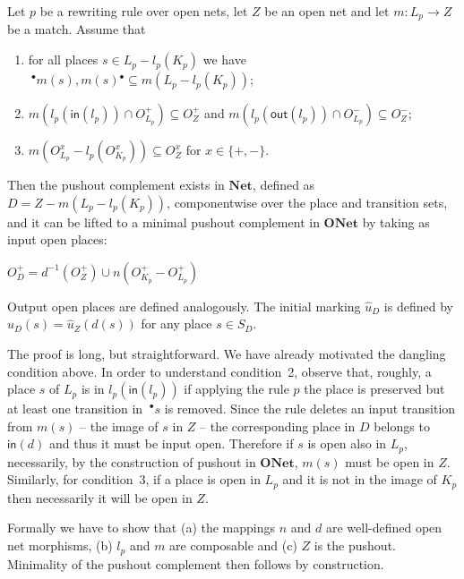 \documentclass{LMCS}
\newcommand{\inp}[1]{\ensuremath{\mathsf{in}({#1})}}
\newcommand{\out}[1]{\ensuremath{\mathsf{out}({#1})}}
\newcommand{\init}[1]{\hat{#1}}
\newcommand{\pre}[1][(\cdot)]{\ensuremath{\!~^\bullet{#1}}}
\newcommand{\post}[1][(\cdot)]{\ensuremath{{#1} {^\bullet}}}
\newcommand{\onet}{\ensuremath{\mathbf{ONet}}}
\newcommand{\net}{\ensuremath{\mathbf{Net}}}
\begin{document}
\begin{lem}
  \label{le:po-complement}
  Let $p$ be a rewriting rule over open nets, let $Z$ be an open net and let
  $m : L_p \to Z$ be a match. Assume that
  \begin{enumerate}[\em(1)]

  \item for all places $s \in L_p - l_p(K_p)$ we have $\pre[m(s)], \post[m(s)]
    \subseteq m(L_p - l_p(K_p))$;

  \item
    $m(l_p(\inp{l_p}) \cap O_{L_p}^+) \subseteq O_Z^+$  
    and $m(l_p(\out{l_p}) \cap O_{L_p}^-) \subseteq O_Z^-$;

  \item $m(O_{L_p}^x - l_p(O_{K_p}^x)) \subseteq O_Z^x$ for $x \in \{+,-\}$.


  \end{enumerate}
  Then the pushout complement exists in $\net$, defined as $D = Z -
  m(L_p - l_p(K_p))$, componentwise over the place and transition
  sets, and it can be lifted to a minimal pushout complement in
  $\onet$ by taking as input open places:
  \begin{center}
     $O_D^+ = d^{-1}(O_Z^+) \cup n(O_{K_p}^+ - O_{L_p}^+)$
  \end{center}
  Output open places are defined analogously.
  The initial marking $\init{u}_D$ is defined by $\init{u}_D(s) = \init{u}_Z(d(s))$ for any place
  $s \in S_D$.
\end{lem}


\proof
  The proof is long, but straightforward. We have already motivated the
  dangling condition above.
In order to understand condition~2, observe that, roughly,
  a place $s$ of $L_p$ is in   $l_p(\inp{l_p})$ if   applying the 
  rule $p$ the place is preserved but at least one
  transition in $\pre[s]$ is removed.
Since the rule deletes an input
  transition from $m(s)$ -- the image of $s$ in $Z$ -- the
  corresponding place in $D$ belongs to $\inp{d}$ and thus it must be
  input open.  Therefore if $s$ is open also in $L_p$, necessarily, by
  the construction of pushout in $\onet$, $m(s)$ must be open in $Z$.
Similarly, for condition~3, if a place is open in $L_p$ and it is not in the
  image of $K_p$ then necessarily it will be open in $Z$.
  
  Formally we have to show that (a) the mappings $n$ and $d$ are well-defined
  open net morphisms, (b) $l_p$ and $m$ are composable and (c) $Z$ is the
  pushout.
Minimality of the pushout complement then follows by construction.
\end{document}
